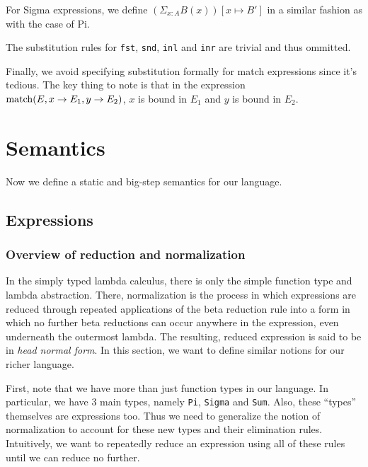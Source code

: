 \documentclass{article}
\begin{document}
For Sigma expressions, we define $(\Sigma_{x : A} B(x)) [x \mapsto B']$ in a
similar fashion as with the case of Pi.

The substitution rules for \verb|fst|, \verb|snd|, \verb|inl| and \verb|inr| are
trivial and thus ommitted.

Finally, we avoid specifying substitution formally for match expressions since it's
tedious. The key thing to note is that in the expression
$\operatorname{match}(E, x \rightarrow E_1, y \rightarrow E_2)$, $x$ is bound in $E_1$ and $y$
is bound in $E_2$.

\section{Semantics}
\begin{comment}
  https://www.andres-loeh.de/LambdaPi/LambdaPi.pdf
  http://math.andrej.com/2012/11/08/how-to-implement-dependent-type-theory-i/
  
  http://fsl.cs.illinois.edu/images/archive/b/b3/20110221180817!CS522-Spring-2011-PL-book-bigstep.pdf
  https://www.cs.cornell.edu/courses/cs4110/2010fa/lectures/lecture03.pdf
\end{comment}

Now we define a static and big-step semantics for our language.

\subsection{Expressions}
\subsubsection{Overview of reduction and normalization}

In the simply typed lambda calculus, there is only the simple function 
type and lambda abstraction. There, normalization is the process in which 
expressions are reduced through repeated applications of the beta reduction rule
into a form in which no further beta reductions can occur anywhere in the 
expression, even underneath the outermost lambda.
The resulting, reduced expression is said to be in \textit{head normal form}. 
In this section, we want to define similar notions for our richer language.

First, note that we have more than just function types in our language. In
particular, we have 3 main types, namely \verb|Pi|, \verb|Sigma| and \verb|Sum|.
Also, these ``types'' themselves are expressions too. Thus we need to generalize
the notion of normalization to account for these new types and their elimination
rules. Intuitively, we want to repeatedly reduce an expression using all of
these rules until we can reduce no further.
\end{document}
